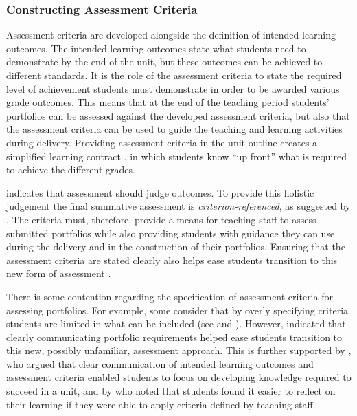 \subsubsection{Constructing Assessment Criteria} %
\label{sub:constructing_assessment_criteria}

Assessment criteria are developed alongside the definition of intended learning outcomes. The intended learning outcomes state what students need to demonstrate by the end of the unit, but these outcomes can be achieved to different standards. It is the role of the assessment criteria to state the required level of achievement students must demonstrate in order to be awarded various grade outcomes. This means that at the end of the teaching period students' portfolios can be assessed against the developed assessment criteria, but also that the assessment criteria can be used to guide the teaching and learning activities during delivery. Providing assessment criteria in the unit outline creates a simplified learning contract \cite{Stephenson:1993}, in which students know ``up front'' what is required to achieve the different grades. 

 indicates that assessment should judge outcomes. To provide this holistic judgement the final summative assessment is \emph{criterion-referenced}, as suggested by \citet{Biggs:1997}. The criteria must, therefore, provide a means for teaching staff to assess submitted portfolios while also providing students with guidance they can use during the delivery and in the construction of their portfolios. Ensuring that the assessment criteria are stated clearly also helps ease students transition to this new form of assessment \cite{Smith:2001}.

There is some contention regarding the specification of assessment criteria for assessing portfolios. For example, some consider that by overly specifying criteria students are limited in what can be included (see \citet{Driessen:2005} and \citet{Tigelaar:2007}). However, \citet{Smith:2001} indicated that clearly communicating portfolio requirements helped ease students transition to this new, possibly unfamiliar, assessment approach. This is further supported by \citet{Allan:1996}, who argued that clear communication of intended learning outcomes and assessment criteria enabled students to focus on developing knowledge required to succeed in a unit, and by \citet{Thorpe:2000} who noted that students found it easier to reflect on their learning if they were able to apply criteria defined by teaching staff.

